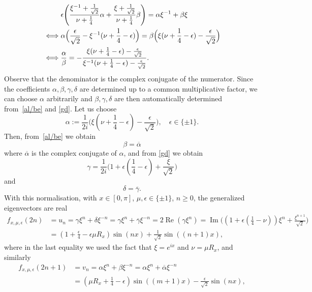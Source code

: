 \documentclass[11pt]{amsart}
\theoremstyle{definition}
\theoremstyle{remark}
\theoremstyle{plain}
\numberwithin{equation}{section}
\numberwithin{lemma}{section}
\numberwithin{definition}{section}
\numberwithin{proposition}{section}
\numberwithin{corollary}{section}
\numberwithin{theorem}{section}
\numberwithin{remark}{section}
\begin{document}
\begin{align}
 & \epsilon\Bigg(\frac{\xi^{-1}+\frac{1}{\sqrt{2}}}{\nu+\frac{1}{4}}\alpha+\frac{\xi+\frac{1}{\sqrt{2}}}{\nu+\frac{1}{4}}\beta\Bigg)=\alpha\xi^{-1}+\beta\xi \notag \\
 \iff
& \alpha\Big(\frac{\epsilon}{\sqrt{2}}-\xi^{-1}(\nu+\frac{1}{4}-\epsilon)\Big)=\beta\Big(\xi(\nu+\frac{1}{4}-\epsilon)-\frac{\epsilon}{\sqrt{2}}\Big) \notag \\
 \iff
& \frac{\alpha}{\beta}=-\frac{\xi(\nu+\frac{1}{4}-\epsilon)-\frac{\epsilon}{\sqrt{2}}}{\xi^{-1}(\nu+\frac{1}{4}-\epsilon)-\frac{\epsilon}{\sqrt{2}}}. \label{al/be}
\end{align}
Observe that the denominator is the complex conjugate of the numerator. Since the coefficients $\alpha, \beta,\gamma,\delta$ are determined up to a common multiplicative factor, we can choose $\alpha$ arbitrarily and $\beta,\gamma,\delta$ are then automatically determined from~\eqref{al/be} and \eqref{gd}. Let us  choose 
\begin{equation}
 \alpha:=\frac1{2i}\big(\xi(\nu+\frac{1}{4}-\epsilon)-\frac{\epsilon}{\sqrt{2}}\big), \quad \epsilon\in\{\pm1\}.
\end{equation}
Then, from~\eqref{al/be} we obtain 
\begin{equation}
\beta=\overline{\alpha}
\end{equation}
where $\overline{\alpha}$ is the complex conjugate of $\alpha$, and from \eqref{gd} we obtain 
\begin{equation}
\gamma=\frac1{2i}\big(1+\epsilon(\frac{1}{4}-\epsilon)+\frac{\xi}{\sqrt{2}}\big)
\end{equation}
and 
\begin{equation}
\delta=\overline{\gamma}.
\end{equation}
With this normalisation,  with $x\in[0,\pi]$, $\mu, \epsilon \in\{\pm 1\}$, $n\ge0$, the generalized eigenvectors are real
\begin{align*}
  f_{x,\mu, \epsilon}(2n) & =u_n=\gamma\xi^n+\delta\xi^{-n}=\gamma\xi^n+\overline{\gamma}\xi^{-n}=2\operatorname{Re} (\gamma\xi^n)=\operatorname{Im}\Big((1+\epsilon(\frac{1}{4}-\nu))\xi^n+\frac{\xi^{n+1}}{\sqrt{2}}\Big)\\
 &=(1+\frac{\epsilon}{4}-\epsilon\mu R_x)\sin(nx)+\frac{1}{\sqrt{2}}\sin((n+1)x),
\end{align*}
where in the last equality we used the fact that $\xi=e^{ix}$ and $\nu=\mu R_x$, and similarly
\begin{align*}
  f_{x,\mu, \epsilon}(2n+1) & =v_n=\alpha\xi^n+\beta\xi^{-n}=\alpha\xi^n+\overline{\alpha}\xi^{-n} \\
 &=(\mu R_x+\frac{1}{4}-\epsilon)\sin((m+1)x)-\frac{\epsilon}{\sqrt{2}}\sin(nx) ,
\end{align*}
\end{document}
